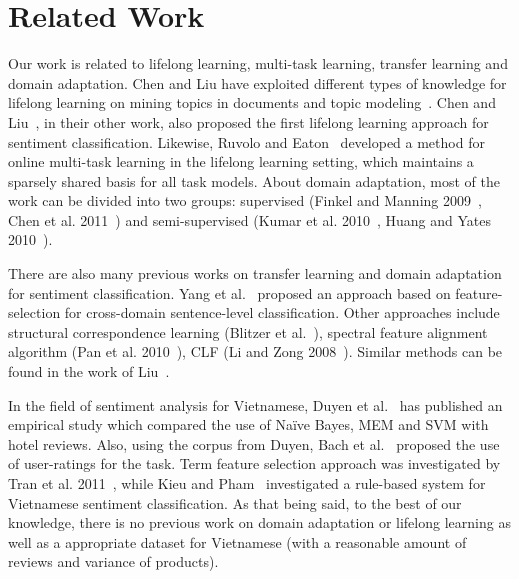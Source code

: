 
\section{Related Work}
Our work is related to lifelong learning, multi-task learning, transfer learning and domain adaptation.
Chen and Liu have exploited different types of knowledge for lifelong learning on mining topics in documents and topic modeling~\cite{chen2014mining,icml2014c2_chenf14}.
Chen and Liu~\cite{chen-ma-liu:2015:ACL-IJCNLP}, in their other work, also proposed the first lifelong learning approach for sentiment classification.
Likewise, Ruvolo and Eaton~\cite{ruvolo2013scalable} developed a method for online multi-task learning in the lifelong learning setting, which maintains a sparsely shared basis for all task models.
About domain adaptation, most of the work can be divided into two groups: supervised (Finkel and Manning 2009~\cite{Finkel:2009:HBD:1620754.1620842}, Chen et al. 2011~\cite{chen2011co}) and semi-supervised (Kumar et al. 2010~\cite{kumar2010co}, Huang and Yates 2010~\cite{huang2010exploring}).

There are also many previous works on transfer learning and domain adaptation for sentiment classification.
Yang et al.~\cite{yang2006knowledge} proposed an approach based on feature-selection for cross-domain sentence-level classification.
Other approaches include structural correspondence learning (Blitzer et al.~\cite{blitzer2007biographies}), spectral feature alignment algorithm (Pan et al. 2010~\cite{pan2010cross}), CLF (Li and Zong 2008~\cite{li2008multi}).
Similar methods can be found in the work of Liu~\cite{Liu12sentimentanalysis}.

In the field of sentiment analysis for Vietnamese, Duyen et al.~\cite{Duyen-Bach:2014} has published an empirical study which compared the use of Naïve Bayes, MEM and SVM with hotel reviews.
Also, using the corpus from Duyen, Bach et al.~\cite{Bach2015322} proposed the use of user-ratings for the task.
Term feature selection approach was investigated by Tran et al. 2011~\cite{zhang2011information}, while Kieu and Pham~\cite{kieu2010sentiment} investigated a rule-based system for Vietnamese sentiment classification.
As that being said, to the best of our knowledge, there is no previous work on domain adaptation or lifelong learning as well as a appropriate dataset for Vietnamese (with a reasonable amount of reviews and variance of products).
